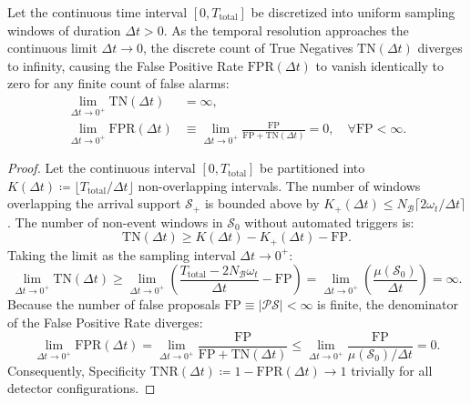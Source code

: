 \begin{theorem}
  \label{thm:supp_roc_degeneracy}
  Let the continuous time interval $[0, T_{\mathrm{total}}]$ be
  discretized into uniform
  sampling windows of duration $\Delta t > 0$. As the temporal
  resolution approaches the
  continuous limit $\Delta t \to 0$, the discrete count of True
  Negatives $\mathrm{TN}(\Delta t)$
  diverges to infinity, causing the False Positive Rate
  $\mathrm{FPR}(\Delta t)$ to vanish
  identically to zero for any finite count of false alarms:
  \begin{align}
    \lim_{\Delta t \to 0^+} \mathrm{TN}(\Delta t) &= \infty,
    \label{eq:supp_tn_divergence} \\
    \lim_{\Delta t \to 0^+} \mathrm{FPR}(\Delta t) &\equiv
    \lim_{\Delta t \to 0^+} \frac{\mathrm{FP}}{\mathrm{FP} +
    \mathrm{TN}(\Delta t)} = 0,
    \quad \forall \mathrm{FP} < \infty.
    \label{eq:supp_fpr_zero}
  \end{align}
\end{theorem}

\begin{proof}
  Let the continuous interval $[0, T_{\mathrm{total}}]$ be partitioned into
  $K(\Delta t) \coloneqq \lfloor T_{\mathrm{total}} / \Delta t
  \rfloor$ non-overlapping intervals.
  The number of windows overlapping the arrival support
  $\mathcal{S}_{+}$ is bounded above by
  $K_{+}(\Delta t) \le N_{\mathcal{B}} \lceil 2\omega_t / \Delta t \rceil$.
  The number of non-event windows in $\mathcal{S}_0$ without
  automated triggers is:
  \begin{equation}
    \mathrm{TN}(\Delta t) \ge K(\Delta t) - K_{+}(\Delta t) - \mathrm{FP}.
  \end{equation}
  Taking the limit as the sampling interval $\Delta t \to 0^+$:
  \begin{equation}
    \lim_{\Delta t \to 0^+} \mathrm{TN}(\Delta t) \ge
    \lim_{\Delta t \to 0^+} \left( \frac{T_{\mathrm{total}} - 2
    N_{\mathcal{B}} \omega_t}{\Delta t} - \mathrm{FP} \right)
    = \lim_{\Delta t \to 0^+} \left(
    \frac{\mu(\mathcal{S}_0)}{\Delta t} \right) = \infty.
  \end{equation}
  Because the number of false proposals $\mathrm{FP} \equiv
  |\mathcal{PS}| < \infty$ is finite,
  the denominator of the False Positive Rate diverges:
  \begin{equation}
    \lim_{\Delta t \to 0^+} \mathrm{FPR}(\Delta t)
    = \lim_{\Delta t \to 0^+} \frac{\mathrm{FP}}{\mathrm{FP} +
    \mathrm{TN}(\Delta t)}
    \le \lim_{\Delta t \to 0^+}
    \frac{\mathrm{FP}}{\mu(\mathcal{S}_0) / \Delta t}
    = 0.
  \end{equation}
  Consequently, Specificity $\mathrm{TNR}(\Delta t) \coloneqq 1 -
  \mathrm{FPR}(\Delta t) \to 1$
  trivially for all detector configurations.
\end{proof}

